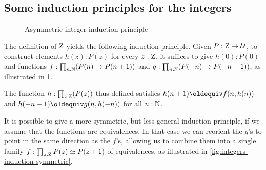 \documentclass[a4paper,12pt]{amsart}
\begin{document}
\subsection{Some induction principles for the integers}
\label{sec:integers-induction}

\begin{figure}[b]
  \centering
  \caption{Asymmetric integer induction principle}
  \label{fig:integers-induction-asymmetric}
\end{figure}

The definition of $\mathrm{Z}$ yields the following induction principle.
Given $P : \mathrm{Z} \to \mathcal{U}$, to construct elements $h(z) : P(z)$ for every $z : \mathrm{Z}$,
it suffices to give $h(0): P(0)$ and functions
$f : \prod_{n:\mathbb{N}}(P(n) \to P(n+1))$ and
$g : \prod_{n:\mathbb{N}}(P(-n) \to P(-n-1))$,
as illustrated in \cref{fig:integers-induction-asymmetric}.

The function $h:\prod_{z:\mathbb{Z}}(P(z))$ thus defined satisfies
$h(n+1)\jdeq f(n,h(n))$ and $h(-n-1)\jdeq g(n,h(-n))$ for all $n:\mathbb{N}$.

It is possible to give a more symmetric, but less general induction principle,
if we assume that the functions are equivalences.
In that case we can reorient the $g$'s to point in the same direction as the $f$'s,
allowing us to combine them into a single family $f : \prod_{z:\mathrm{Z}}P(z) \simeq P(z+1)$ of equivalences,
as illustrated in \cref{fig:integers-induction-symmetric}.
\end{document}

